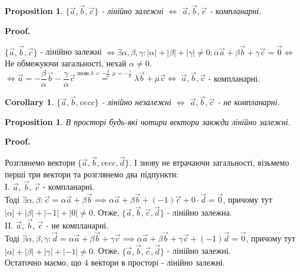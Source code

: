 \documentclass[a4paper, 10pt]{extarticle}
\makeatletter
\def\qed{$\blacksquare$}
\def\qed{$\blacksquare$}
\theoremstyle{theoremdd}
\theoremstyle{theoremdd}
\theoremstyle{theoremdd}
\theoremstyle{theoremdd}
\theoremstyle{theoremdd}
\newtheorem{proposition}[theorem]{Proposition}
\theoremstyle{theoremdd}
\theoremstyle{theoremdd}
\theoremstyle{theoremdd}
\newtheorem{corollary}[theorem]{Corollary}
\renewenvironment{proof}[1][Proof.\\]{\par
\pushQED{\hfill \qed}%
\normalfont \topsep6\p@\@plus6\p@\relax
\trivlist
\item\relax
{\bfseries
#1\@addpunct{.}}\hspace\labelsep\ignorespaces
}{%
\popQED\endtrivlist\@endpefalse
}
\makeatother
\begin{document}
\begin{proposition}
$\{\vec{a},\vec{b},\vec{c} \}$ - лінійно залежні $\iff$ $\vec{a},\vec{b},\vec{c}$ - компланарні.
\end{proposition}

\begin{proof}
	$\{\vec{a},\vec{b},\vec{c}\}$ - лінійно залежні $\iff \exists \alpha, \beta, \gamma: |\alpha| + |\beta| + |\gamma| \neq 0: \alpha \vec{a} + \beta \vec{b} + \gamma \vec{c} = \vec{0} \boxed{\iff}$\\
	Не обмежуючи загальності, нехай $\alpha \neq 0$.\\
$\boxed{\iff} \vec{a} = -\dfrac{\beta}{\alpha} \vec{b} - \dfrac{\gamma}{\alpha} \vec{c} \overset{\textrm{позн.} \lambda = -\frac{\beta}{\alpha}, \mu = -\frac{\gamma}{\alpha}}{=} \lambda \vec{b} + \mu \vec{c} \iff$ $\vec{a},\vec{b},\vec{c}$ - компланарні.
\end{proof}

\begin{corollary}
	$\{\vec{a},\vec{b},vec{c}\}$ - лінійно незалежні $\iff$ $\vec{a},\vec{b},\vec{c}$ - не компланарні.
\end{corollary}

\begin{proposition}
	В просторі будь-які чотири вектори завжди лінійно залежні.
\end{proposition}

\begin{proof}
	Розглянемо вектори $\{\vec{a},\vec{b},vec{c},\vec{d}\}$. І знову не втрачаючи загальності, візьмемо перші три вектори та розглянемо два підпункти:\\
	I. $\vec{a}$, $\vec{b}$, $\vec{c}$ - компланарні.\\
	Тоді $\exists \alpha, \beta: \vec{c} = \alpha \vec{a} + \beta \vec{b} \implies \alpha \vec{a} + \beta \vec{b} + (-1)\vec{c} + 0 \cdot \vec{d} = \vec{0}$, причому тут $|\alpha| + |\beta| + |-1| + |0| \neq 0$. Отже, $\{\vec{a}, \vec{b}, \vec{c}, \vec{d}\}$ - лінійно залежна.
	\bigskip \\
	II. $\vec{a}$, $\vec{b}$, $\vec{c}$ - не компланарні.\\
	Тоді $\exists \alpha, \beta, \gamma: \vec{d} = \alpha \vec{a} + \beta \vec{b} + \gamma \vec{c} \implies \alpha \vec{a} + \beta \vec{b} + \gamma \vec{c} + (-1)\vec{d} = \vec{0}$, причому тут $|\alpha| + |\beta| + |\gamma| + |-1| \neq 0$. Отже, $\{\vec{a}, \vec{b}, \vec{c}, \vec{d}\}$ - лінійно залежні.\\
	Остаточно маємо, що 4 вектори в просторі - лінійно залежні.
\end{proof}
\end{document}
